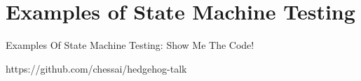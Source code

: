 \section{Examples of State Machine Testing}

  \frame{\sectionpage}
  
  \begin{frame}{Examples Of State Machine Testing: Show Me The Code!}
     \begin{center} 
     https://github.com/chessai/hedgehog-talk 
     \end{center}
  \end{frame}